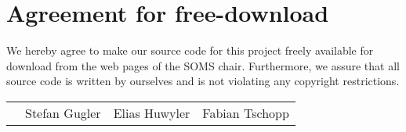 \section*{Agreement for free-download}
\bigskip
\bigskip

\large We hereby agree to make our source code for this project freely available for download from the web pages of the SOMS chair. Furthermore, we assure that all source code is written by ourselves and is not violating any copyright restrictions.

\begin{center}
	\bigskip
	\bigskip
	\begin{tabular}{@{}p{2cm}@{}p{4cm}@{}@{}p{4cm}@{}@{}p{4cm}@{}}
		\begin{minipage}{3cm}
		
		\end{minipage}
		&
		\begin{minipage}{6cm}
			\large Stefan Gugler
		\end{minipage}
		&
		\begin{minipage}{6cm}
			\large Elias Huwyler
		\end{minipage}
		&
		\begin{minipage}{6cm}
			\large Fabian Tschopp
		\end{minipage}
	\end{tabular}
\end{center}